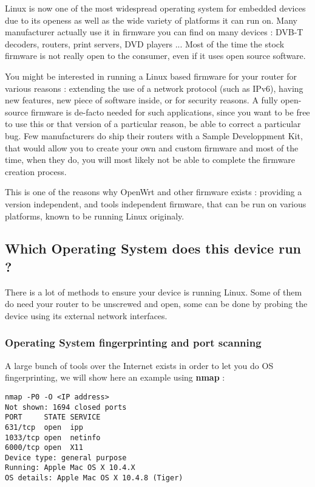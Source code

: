 Linux is now one of the most widespread operating system for embedded devices due to its openess as well as the wide variety of platforms it can run on. Many manufacturer actually use it in firmware you can find on many devices : DVB-T decoders, routers, print servers, DVD players ... Most of the time the stock firmware is not really open to the consumer, even if it uses open source software.

You might be interested in running a Linux based firmware for your router for various reasons : extending the use of a network protocol (such as IPv6), having new features, new piece of software inside, or for security reasons. A fully open-source firmware is de-facto needed for such applications, since you want to be free to use this or that version of a particular reason, be able to correct a particular bug. Few manufacturers do ship their routers with a Sample Developpment Kit, that would allow you to create your own and custom firmware and most of the time, when they do, you will most likely not be able to complete the firmware creation process.

This is one of the reasons why OpenWrt and other firmware exists : providing a version independent, and tools independent firmware, that can be run on various platforms, known to be running Linux originaly.

\subsection{Which Operating System does this device run ?}

There is a lot of methods to ensure your device is running Linux. Some of them do need your router to be unscrewed and open, some can be done by probing the device using its external network interfaces.

\subsubsection{Operating System fingerprinting and port scanning}

A large bunch of tools over the Internet exists in order to let you do OS fingerprinting, we will show here an example using \textbf{nmap} :

\begin{Verbatim}
nmap -P0 -O <IP address>
Not shown: 1694 closed ports
PORT     STATE SERVICE
631/tcp  open  ipp
1033/tcp open  netinfo
6000/tcp open  X11
Device type: general purpose
Running: Apple Mac OS X 10.4.X
OS details: Apple Mac OS X 10.4.8 (Tiger)
\end{Verbatim}

